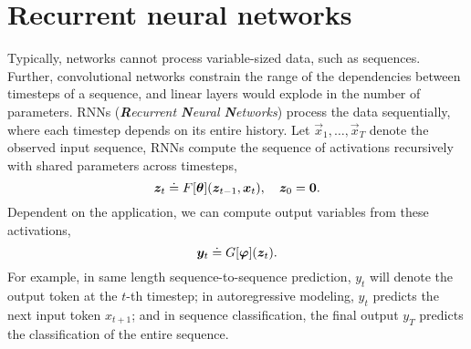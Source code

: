 \section{Recurrent neural networks}

Typically, networks cannot process variable-sized data, such as sequences. Further, convolutional
networks constrain the range of the dependencies between timesteps of a sequence, and linear layers
would explode in the number of parameters. RNNs (\textit{\textbf{R}ecurrent \textbf{N}eural
    \textbf{N}etworks}) process the data sequentially, where each timestep depends on its entire
history. Let $\vec{x}_1, \ldots, \vec{x}_T$ denote the observed input sequence, RNNs compute the
sequence of activations recursively with shared parameters across timesteps, \[
    \vec{z}_t \doteq F[\vec{\theta}]\lft( \vec{z}_{t-1}, \vec{x}_t \rgt), \quad \vec{z}_0 = \vec{0}.
\]
Dependent on the application, we can compute output variables from these activations, \[
    \vec{y}_t \doteq G[\vec{\varphi}]\lft( \vec{z}_t \rgt).
\]
For example, in same length sequence-to-sequence prediction, $y_t$ will denote the output token at
the $t$-th timestep; in autoregressive modeling, $y_t$ predicts the next input token $x_{t+1}$; and
in sequence classification, the final output $y_T$ predicts the classification of the entire
sequence.



